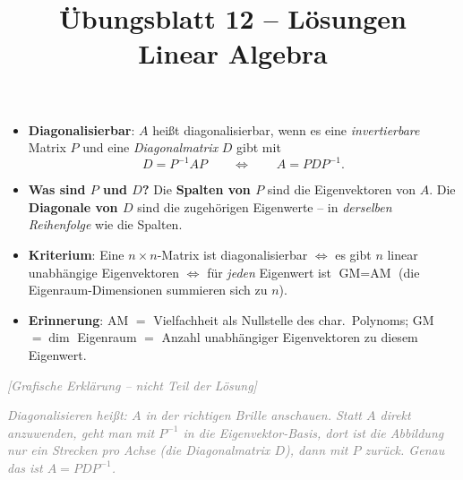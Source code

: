 \documentclass[a4paper,12pt]{article}
\title{\"Ubungsblatt 12 -- L\"osungen \\ \large Linear Algebra}
\author{}
\date{}
\newcommand{\grafik}{\textcolor{gray}{\small\textit{[Grafische Erkl\"arung -- nicht Teil der L\"osung]}}}
\begin{document}
\maketitle

\begin{begriffe}
\begin{itemize}[leftmargin=*, nosep]
    \item \textbf{Diagonalisierbar}: $A$ hei\ss t diagonalisierbar, wenn es eine \emph{invertierbare} Matrix $P$ und eine \emph{Diagonalmatrix} $D$ gibt mit
    \[
    D = P^{-1} A P \qquad\Longleftrightarrow\qquad A = P D P^{-1}.
    \]
    \item \textbf{Was sind $P$ und $D$?} Die \textbf{Spalten von $P$} sind die Eigenvektoren von $A$. Die \textbf{Diagonale von $D$} sind die zugeh\"origen Eigenwerte -- in \emph{derselben Reihenfolge} wie die Spalten.
    \item \textbf{Kriterium}: Eine $n\times n$-Matrix ist diagonalisierbar $\Leftrightarrow$ es gibt $n$ linear unabh\"angige Eigenvektoren $\Leftrightarrow$ f\"ur \emph{jeden} Eigenwert ist $\text{GM} = \text{AM}$ (die Eigenraum-Dimensionen summieren sich zu $n$).
    \item \textbf{Erinnerung}: AM $=$ Vielfachheit als Nullstelle des char.\ Polynoms; GM $= \dim$ Eigenraum $=$ Anzahl unabh\"angiger Eigenvektoren zu diesem Eigenwert.
\end{itemize}
\end{begriffe}

\grafik

\begin{center}
\end{center}

\textcolor{gray}{\small\textit{Diagonalisieren hei\ss t: $A$ in der richtigen Brille anschauen. Statt $A$ direkt anzuwenden, geht man mit $P^{-1}$ in die Eigenvektor-Basis, dort ist die Abbildung nur ein \emph{Strecken} pro Achse (die Diagonalmatrix $D$), dann mit $P$ zur\"uck. Genau das ist $A = P D P^{-1}$.}}
\end{document}
